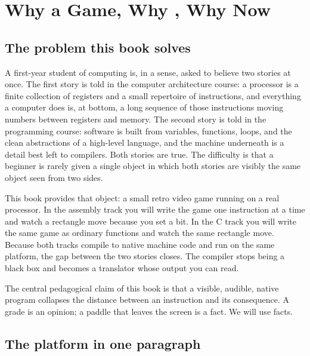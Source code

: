 \chapter[Why a Game, Why RISC-V, Why Now]{Why a Game, Why \riscv, Why Now}
\label{ch:intro}

\section{The problem this book solves}

A first-year student of computing is, in a sense, asked to believe two stories at
once. The first story is told in the computer architecture course: a processor is
a finite collection of registers and a small repertoire of instructions, and
everything a computer does is, at bottom, a long sequence of those instructions
moving numbers between registers and memory. The second story is told in the
programming course: software is built from variables, functions, loops, and the
clean abstractions of a high-level language, and the machine underneath is a
detail best left to compilers. Both stories are true. The difficulty is that a
beginner is rarely given a single object in which both stories are visibly the
same object seen from two sides.

This book provides that object: a small retro video game running on a real
\riscv processor. In the assembly track you will write the game one instruction
at a time and watch a rectangle move because you set a bit. In the C track you
will write the same game as ordinary functions and watch the same rectangle move.
Because both tracks compile to native \riscv machine code and run on the same
platform, the gap between the two stories closes. The compiler stops being a
black box and becomes a translator whose output you can read.

\begin{prgconcept}
The central pedagogical claim of this book is that a visible, audible, native
program collapses the distance between an instruction and its consequence. A
grade is an opinion; a paddle that leaves the screen is a fact. We will use facts.
\end{prgconcept}

\section{The platform in one paragraph}

